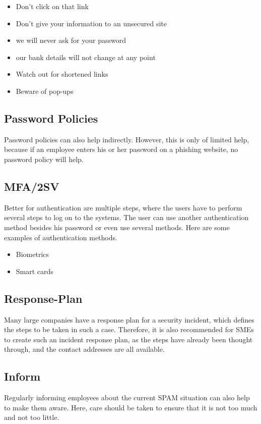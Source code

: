 \begin{itemize}
    \item Don't click on that link
    \item Don't give your information to an unsecured site
    \item we will never ask for your password
    \item our bank details will not change at any point
    \item Watch out for shortened links
    \item Beware of pop-ups
\end{itemize}


\subsection{Password Policies}
Password policies can also help indirectly.
However, this is only of limited help, because if an employee enters his or her password on a phishing website, no password policy will help.
\subsection{MFA/2SV}
Better for authentication are multiple steps, where the users have to perform several steps to log on to the systems. The user can use another authentication method besides his password or even use several methods.
Here are some examples of authentication methods.

\begin{itemize}
    \item Biometrics
    \item Smart cards
\end{itemize}

\subsection{Response-Plan}
Many large companies have a response plan for a security incident, which defines the steps to be taken in such a case.
Therefore, it is also recommended for SMEs to create such an incident response plan, as the steps have already been thought through, and the contact addresses are all available.

\subsection{Inform}
Regularly informing employees about the current SPAM situation can also help to make them aware.
Here, care should be taken to ensure that it is not too much and not too little.

